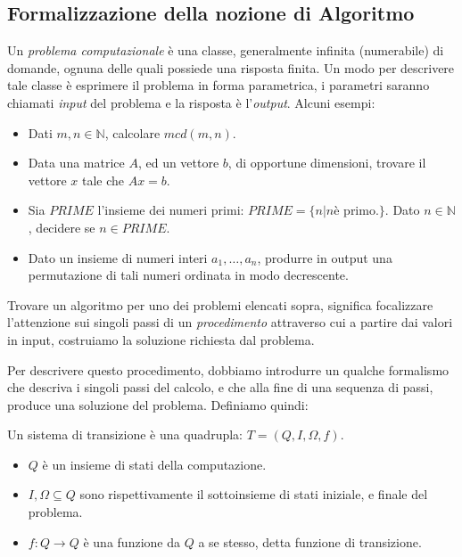 \subsection{Formalizzazione della nozione di Algoritmo}

Un \emph{problema computazionale} è una classe, generalmente infinita
(numerabile) di domande, ognuna delle quali possiede una risposta
finita. Un modo per descrivere tale classe è esprimere il problema in
forma parametrica, i parametri saranno chiamati \emph{input} del
problema e la risposta è l'\emph{output}.  Alcuni esempi:

\begin{itemize}
\item Dati $m,n \in \mathbb{N}$, calcolare $mcd(m,n)$.
\item Data una matrice $A$, ed un vettore $b$, di opportune
  dimensioni, trovare il vettore $x$ tale che $Ax = b$.
\item Sia $PRIME$ l'insieme dei numeri primi: $PRIME = \{ n | n \text{
    è primo.} \}$.  Dato $n \in \mathbb{N}$, decidere se $n \in PRIME$.
\item Dato un insieme di numeri interi $a_1,\ldots,a_n$, produrre in
  output una permutazione di tali numeri ordinata in modo decrescente.
\end{itemize}

Trovare un algoritmo per uno dei problemi elencati sopra, significa
focalizzare l'attenzione sui singoli passi di un \emph{procedimento}
attraverso cui a partire dai valori in input, costruiamo la soluzione
richiesta dal problema.

Per descrivere questo procedimento, dobbiamo introdurre un qualche
formalismo che descriva i singoli passi del calcolo, e che alla fine
di una sequenza di passi, produce una soluzione del
problema. Definiamo quindi:

\begin{defn}
  Un sistema di transizione è una quadrupla: $T = (Q, I, \Omega, f)$.
  \begin{itemize}
  \item $Q$ è un insieme di stati della computazione.
  \item $ I, \Omega \subseteq Q $ sono rispettivamente il sottoinsieme
    di stati iniziale, e finale del problema.
  \item $ f : Q \rightarrow Q $ è una funzione da $Q$ a se stesso,
    detta funzione di transizione.
  \end{itemize}
\end{defn}


